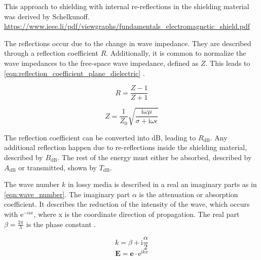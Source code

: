 This approach to shielding with internal re-reflections in the shielding material was derived by Schelkunoff. 
\url{https://www.ieee.li/pdf/viewgraphs/fundamentals_electromagnetic_shield.pdf}

The reflections occur due to the change in wave impedance. They are described through a reflection coefficient $R$. Additionally, it is common to normalize the wave impedances to the free-space wave impedance, defined as $Z$. This leads to \autoref{eqn:reflection_coefficient_plane_dielectric} \cite{Collin_2015}. 

\begin{equation}
    R=\frac{Z-1}{Z+1}
    \label{eqn:reflection_coefficient_plane_dielectric}
\end{equation}

\begin{equation}
    Z=\frac{1}{Z_0}\sqrt{\frac{\mathrm{i}\omega\mu}{\sigma+\mathrm{i}\omega\epsilon}}
\end{equation}

The reflection coefficient can be converted into dB, leading to $R_\mathrm{dB}$. Any additional reflection happen due to re-reflections inside the shielding material, described by $B_\mathrm{dB}$. The rest of the energy must either be absorbed, described by $A_\mathrm{dB}$ or transmitted, shown by $T_\mathrm{dB}$. 


The wave number $k$ in lossy media is described in a real an imaginary parts as in \autoref{eqn:wave_number}. The imaginary part $\alpha$ is the attenuation or absorption coefficient. It describes the reduction of the intensity of the wave, which occurs with $\mathrm{e}^{-\alpha x}$, where x is the coordinate direction of propagation. The real part $\beta=\frac{2\pi}{\lambda}$ is the phase constant \cite{Jackson}.

\begin{equation}
    k = \beta + \mathrm{i}\frac{\alpha}{2}
    \label{eqn:wave_number}
\end{equation}
\begin{equation}
    \mathbf{E} = \mathbf{e}\cdot \mathrm{e}^{\mathrm{i}kx}
\end{equation}



